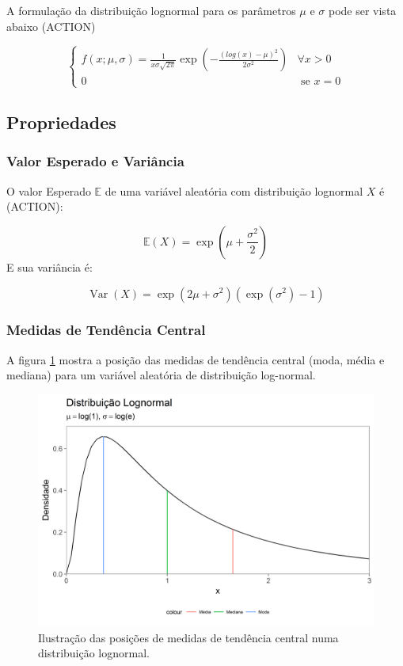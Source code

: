 \documentclass[a4paper]{article}
\begin{document}
A formulação da distribuição lognormal para os parâmetros \(\mu\) e
\(\sigma\) pode ser vista abaixo (ACTION)

\[\begin{cases}
f(x;\mu, \sigma) = \frac{1}{x\sigma\sqrt{2\pi}}\exp(-\frac{(log(x) - \mu)^2}{2\sigma^2}) & \forall x > 0 \\ 
0 & \text{ se } x = 0 
\end{cases}\]

\subsection{Propriedades}\label{propriedades}

\subsubsection{Valor Esperado e
Variância}\label{valor-esperado-e-variancia}

O valor Esperado \(\mathbb{E}\) de uma variável aleatória com
distribuição lognormal \(X\) é (ACTION):

\[\mathbb{E}(X) = \exp \left (\mu + \frac{\sigma^2}{2} \right )\] E sua
variância é:

\[\newcommand{\Var}{\operatorname{Var}} \Var(X) = \exp (2\mu+\sigma^2)(\exp(\sigma^2)-1)\]

\subsubsection{Medidas de Tendência
Central}\label{medidas-de-tendencia-central}

A figura \ref{fig:densidade_medidas} mostra a posição das medidas de
tendência central (moda, média e mediana) para um variável aleatória de
distribuição log-normal.

\begin{figure}[H]

{\centering \includegraphics[width=0.7\linewidth]{images/densidade_medidas-1} 

}

\caption{Ilustração das posições de medidas de tendência central numa distribuição lognormal.}\label{fig:densidade_medidas}
\end{figure}
\end{document}
